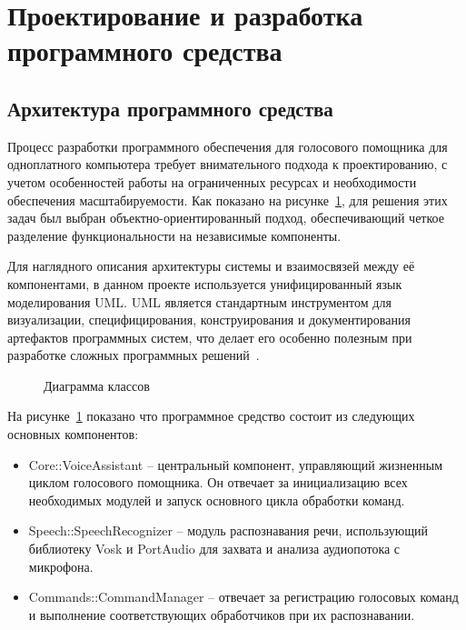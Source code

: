 \section{Проектирование и разработка программного средства}

\subsection{Архитектура программного средства}

Процесс разработки программного обеспечения для голосового помощника для одноплатного компьютера требует внимательного подхода к проектированию, с учетом особенностей работы на ограниченных ресурсах и необходимости обеспечения масштабируемости. Как показано на рисунке~\ref{fig:class_diagram}, для решения этих задач был выбран объектно-ориентированный подход, обеспечивающий четкое разделение функциональности на независимые компоненты.

Для наглядного описания архитектуры системы и взаимосвязей между её компонентами, в данном проекте используется унифицированный язык моделирования UML. UML является стандартным инструментом для визуализации, специфицирования, конструирования и документирования артефактов программных систем, что делает его особенно полезным при разработке сложных программных решений~\cite{UML}.

\begin{figure}[H]
	\centering
	\caption{Диаграмма классов}
	\label{fig:class_diagram}
\end{figure}
На рисунке~\ref{fig:class_diagram} показано что программное средство состоит из следующих основных компонентов:

\begin{itemize}
	\item {Core::VoiceAssistant} -- центральный компонент, управляющий жизненным циклом голосового помощника. Он отвечает за инициализацию всех необходимых модулей и запуск основного цикла обработки команд.
	
	\item {Speech::SpeechRecognizer} -- модуль распознавания речи, использующий библиотеку Vosk и PortAudio для захвата и анализа аудиопотока с микрофона.
	
	\item {Commands::CommandManager} -- отвечает за регистрацию голосовых команд и выполнение соответствующих обработчиков при их распознавании.
\end{itemize}

